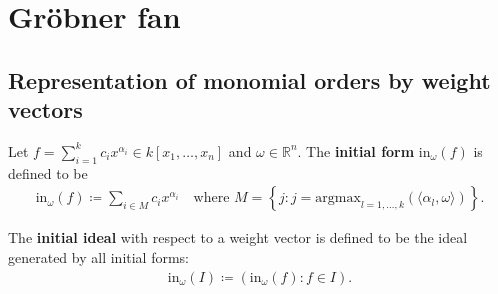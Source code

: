 \documentclass[a4paper, 11pt]{article}
\begin{document}


\section{Gröbner fan}

\subsection{Representation of monomial orders by weight vectors}

\begin{defi}
  Let \( f = \sum_{i=1}^k c_i x^{\alpha_i} \in k[x_1,\dots,x_n] \) and \( \omega \in \mathbb R^n \). The \textbf{initial form} \( \mathrm{in}_\omega(f) \) is defined to be 
  \begin{align*}
    \mathrm{in}_\omega(f) \coloneqq \sum_{i \in M} c_i x^{\alpha_i} \quad \text{where } M = \left\{ j : j = \mathrm{argmax}_{l=1,\dots,k}(\langle \alpha_l, \omega \rangle) \right\}.
  \end{align*}

  The \textbf{initial ideal} with respect to a weight vector is defined to be the ideal generated by all initial forms:
  \begin{align*}
    \mathrm{in}_\omega (I) \coloneqq (\mathrm{in}_\omega(f) : f \in I).
  \end{align*}
\end{defi}
\end{document}
